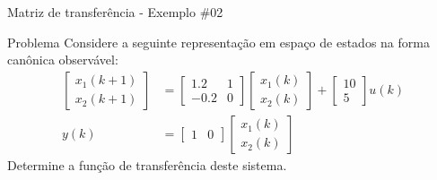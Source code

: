 \cprotect{}

\begin{frame}{Matriz de transferência - Exemplo \#02}
\begin{block}{Problema}
Considere a seguinte representação em espaço de estados na forma canônica observável:
\begin{align*}
    \begin{bmatrix} x_1(k+1) \\ x_2(k+1) \end{bmatrix}
    &=
    \begin{bmatrix}
    \num{1,2} & 1 \\ -\num{0,2} & 0
    \end{bmatrix}
    \begin{bmatrix}
    x_1(k) \\ x_2(k)
    \end{bmatrix}
    +
    \begin{bmatrix}
    10 \\ 5
    \end{bmatrix}
    u(k) \\
    y(k)
    &=
    \begin{bmatrix}
    1 & 0
    \end{bmatrix}
    \begin{bmatrix}
    x_1(k) \\ x_2(k)
    \end{bmatrix}
\end{align*}
Determine a função de transferência deste sistema.
\end{block}
\end{frame}

